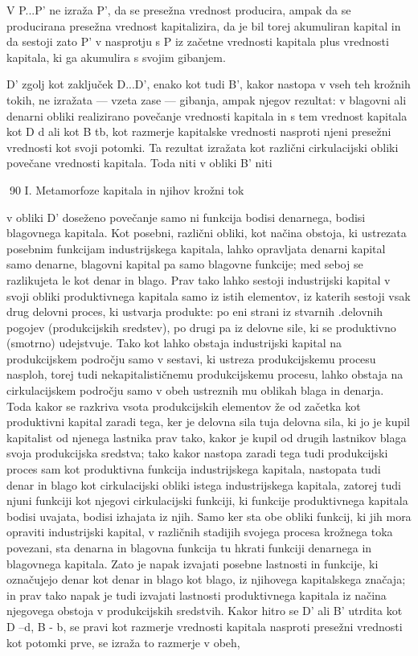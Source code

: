 \documentclass[kapital_02.tex]{subfiles}
\begin{document}
V P...P' ne izraža P', da se presežna vrednost producira, ampak da se producirana presežna vrednost kapitalizira, da je bil torej akumuliran kapital in da sestoji zato P' v nasprotju s P iz začetne vrednosti kapitala plus vrednosti kapitala, ki ga akumulira s svojim gibanjem.

D' zgolj kot zaključek D...D', enako kot tudi B', kakor nastopa v vseh teh krožnih tokih, ne izražata — vzeta zase — gibanja, ampak njegov rezultat: v blagovni ali denarni obliki realizirano povečanje vrednosti kapitala in s tem vrednost kapitala kot D d ali kot B tb, kot razmerje kapitalske vrednosti nasproti njeni presežni vrednosti kot svoji potomki. Ta rezultat izražata kot različni cirkulacijski obliki povečane vrednosti kapitala. Toda niti v obliki B' niti



90 I. Metamorfoze kapitala in njihov krožni tok



 v obliki D' doseženo povečanje samo ni funkcija bodisi denarnega, bodisi blagovnega kapitala. Kot posebni, različni obliki, kot načina obstoja, ki ustrezata posebnim funkcijam industrijskega kapitala, lahko opravljata denarni kapital samo denarne, blagovni kapital pa samo blagovne funkcije; med seboj se razlikujeta le kot denar in blago. Prav tako lahko sestoji industrijski kapital v svoji obliki produktivnega kapitala samo iz istih elementov, iz katerih sestoji vsak drug delovni proces, ki ustvarja produkte: po eni strani iz stvarnih .delovnih pogojev (produkcijskih sredstev), po drugi pa iz delovne sile, ki se produktivno (smotrno) udejstvuje. Tako kot lahko obstaja industrijski kapital na produkcijskem področju samo v sestavi, ki ustreza produkcijskemu procesu nasploh, torej tudi nekapitalističnemu produkcijskemu procesu, lahko obstaja na cirkulacijskem področju samo v obeh ustreznih mu oblikah blaga in denarja. Toda kakor se razkriva vsota produkcijskih elementov že od začetka kot produktivni kapital zaradi tega, ker je delovna sila tuja delovna sila, ki jo je kupil kapitalist od njenega lastnika prav tako, kakor je kupil od drugih lastnikov blaga svoja produkcijska sredstva; tako kakor nastopa zaradi tega tudi produkcijski proces sam kot produktivna funkcija industrijskega kapitala, nastopata tudi denar in blago kot cirkulacijski obliki istega industrijskega kapitala, zatorej tudi njuni funkciji kot njegovi cirkulacijski funkciji, ki funkcije produktivnega kapitala bodisi uvajata, bodisi izhajata iz njih. Samo ker sta obe obliki funkcij, ki jih mora opraviti industrijski kapital, v različnih stadijih svojega procesa krožnega toka povezani, sta denarna in blagovna funkcija tu hkrati funkciji denarnega in blagovnega kapitala. Zato je napak izvajati posebne lastnosti in funkcije, ki označujejo denar kot denar in blago kot blago, iz njihovega kapitalskega značaja; in prav tako napak je tudi izvajati lastnosti produktivnega kapitala iz načina njegovega obstoja v produkcijskih sredstvih. Kakor hitro se D' ali B' utrdita kot D --d, B - b, se pravi kot razmerje vrednosti kapitala nasproti presežni vrednosti kot potomki prve, se izraža to razmerje v obeh,
\end{document}
